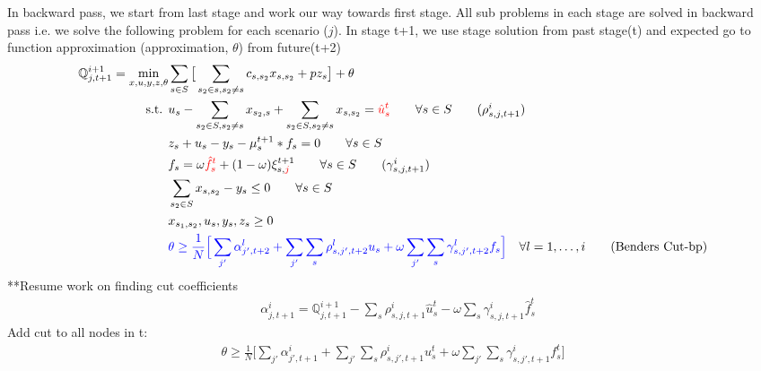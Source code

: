 \documentclass[11pt,letterpaper]{article}
\newcommand{\Q}{\mathbb{Q}}
\begin{document}
In backward pass, we start from last stage and work our way towards first stage. All sub problems in each stage are solved in backward pass i.e. we solve the following problem for each scenario ($j$).
In stage t+1, we use stage solution from past stage(t) and expected go to function approximation (approximation, $\theta$) from future(t+2)
\begin{align}
    \Q^{i+1}_{j,t+1}=\min_{x,u,y,z,\theta} & \sum_{s\in S}\big[\sum_{s_2 \in s, s_2\neq s} c_{s,s_2}x_{s,s_2}+pz_{s}\big]+\theta\\
    \text{s.t. } & u_s-\sum_{s_2\in S,s_2\neq s}x_{s_2,s}+\sum_{s_2\in S, s_2\neq s}x_{s,s_2}=\textcolor{red}{{\hat{u}}_s^{t}} \qquad \forall s \in S \tag{$\rho^i_{s,j,t+1}$}\\
    & z_s+u_s-y_s-\mu^{t+1}_s*f_s=0 \qquad \forall s \in S \\
    &f_s=\omega \textcolor{red}{\hat{f}^{t}_s}+(1-\omega)\xi^{t+1}_{s,\textcolor{red}{j}} \qquad \forall s\in S \tag{$\gamma^i_{s,j,t+1}$}\\
    & \sum_{s_2\in S}x_{s,s_2}- y_{s}\le 0 \qquad \forall s \in S \\
    & x_{s_1,s_2}, u_s,y_s,z_s\ge 0\\
    & \textcolor{blue}{\theta\ge \frac1N \Big[\sum_{j'}\alpha^l_{j',t+2}+\sum_{j'}\sum_s\rho^l_{s,j',t+2}{u}_s +\omega\sum_{j'}\sum_s\gamma^l_{s,j',t+2}{f}_s\Big]} \quad \forall l=1,\dots,i \tag{Benders Cut-bp}
\end{align}
**Resume work on finding cut coefficients
\begin{align}
    &\alpha^i_{j,t+1}=\Q^{i+1}_{j,t+1}-\sum_s\rho^i_{s,j,t+1}{\hat{u}}^t_s-\omega\sum_s\gamma^i_{s,j,t+1}{\hat{f}}^t_s
\end{align}
Add cut to all nodes in t:
\begin{align}
    \theta \ge \frac1N \Big[\sum_{j'}\alpha^i_{j',t+1}+\sum_{j'}\sum_s\rho^i_{s,j',t+1}{u}^t_s+\omega\sum_{j'}\sum_s\gamma^i_{s,j',t+1}{f}^t_s \Big]
\end{align}
\end{document}
